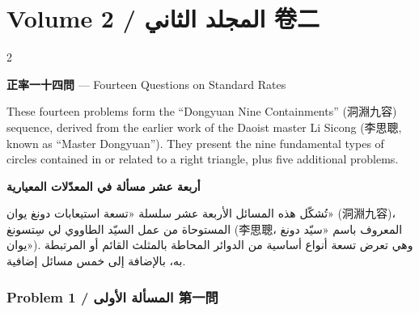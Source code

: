 \documentclass[11pt,a4paper]{article}
\newcommand{\ar}[1]{\arabicfont\beginR #1\endR}
\begin{document}
\section{Volume 2 / \ar{المجلد الثاني} \quad 卷二}
\label{sec:vol2}

\begin{paracol}{2}

\textbf{正率一十四問} --- Fourteen Questions on Standard Rates

These fourteen problems form the ``Dongyuan Nine Containments'' (洞淵九容) sequence, derived from the earlier work of the Daoist master Li Sicong (李思聰, known as ``Master Dongyuan''). They present the nine fundamental types of circles contained in or related to a right triangle, plus five additional problems.

\switchcolumn

\ar{\textbf{أربعة عشر مسألة في المعدّلات المعيارية}}

\vspace{0.3cm}

\ar{تُشكّل هذه المسائل الأربعة عشر سلسلة «تسعة استيعابات دونغ يوان» (洞淵九容)، المستوحاة من عمل السيّد الطاووي لي سِتسونغ (李思聰، المعروف باسم «سيّد دونغ يوان»). وهي تعرض تسعة أنواع أساسية من الدوائر المحاطة بالمثلث القائم أو المرتبطة به، بالإضافة إلى خمس مسائل إضافية.}

\end{paracol}

\subsubsection*{Problem 1 / \ar{المسألة الأولى} \quad 第一問}
\end{document}
